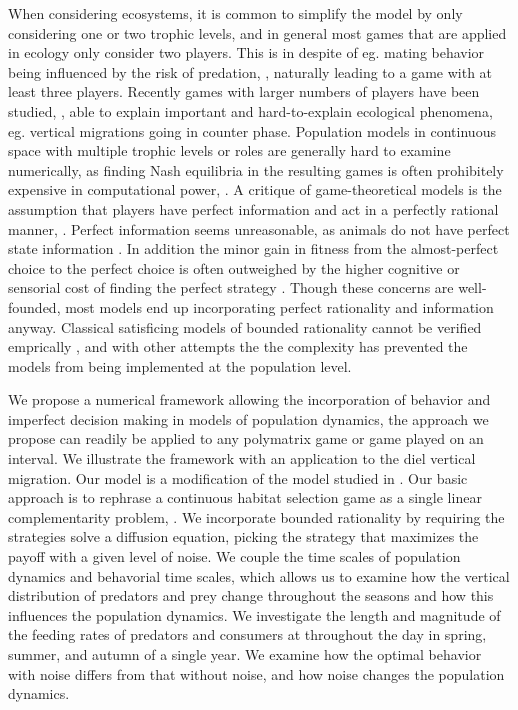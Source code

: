 When considering ecosystems, it is common to simplify the model by only considering one or two trophic levels, and in general most games that are applied in ecology only consider two players. This is in despite of eg. mating behavior being influenced by the risk of predation, \citep{carranza1999red,lima2009predators}, naturally leading to a game with at least three players. Recently games with larger numbers of players have been studied, \citep{pinti2019trophic}, able to explain important and hard-to-explain ecological phenomena, eg. vertical migrations going in counter phase. Population models in continuous space with multiple trophic levels or roles are generally hard to examine numerically, as finding Nash equilibria in the resulting games is often prohibitely expensive in computational power, \citep{empirical_trait,pinti2019trophic}. A critique of game-theoretical models is the assumption that players have perfect information and act in a perfectly rational manner, \citep{jones1999bounded}. Perfect information seems unreasonable, as animals do not have perfect state information \citep{simon1955behavioral}. In addition the minor gain in fitness from the almost-perfect choice to the perfect choice is often outweighed by the higher cognitive or sensorial cost of finding the perfect strategy \citep{simon1956rational, cohen2019bounded}. Though these concerns are well-founded, most models end up incorporating perfect rationality and information anyway. Classical satisficing models of bounded rationality cannot be verified emprically \citep{nonacs1993satisficing}, and with other attempts the \citep{bayesianmodel, thuijsman1995automata} the complexity has prevented the models from being implemented at the population level.




We propose a numerical framework allowing the incorporation of behavior and imperfect decision making in models of population dynamics, the approach we propose can readily be applied to any polymatrix game or game played on an interval. We illustrate the framework with an application to the diel vertical migration. Our model is a modification of the model studied in \citep{verticalmigration}. Our basic approach is to rephrase a continuous habitat selection game as a single linear complementarity problem, \citep{miller1991copositive}. We incorporate bounded rationality by requiring the strategies solve a diffusion equation, picking the strategy that maximizes the payoff with a given level of noise.
We couple the time scales of population dynamics and behavorial time scales, which allows us to examine how the vertical distribution of predators and prey change throughout the seasons and how this influences the population dynamics. We investigate the length and magnitude of the feeding rates of predators and consumers at throughout the day in spring, summer, and autumn of a single year. We examine how the optimal behavior with noise differs from that without noise, and how noise changes the population dynamics.

